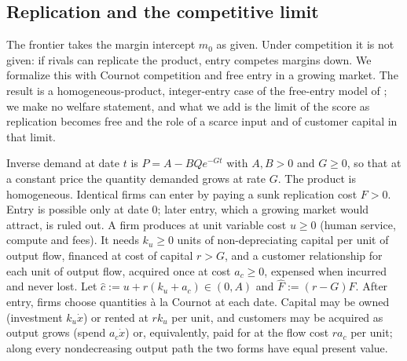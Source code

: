 \subsection{Replication and the competitive limit}\label{sec:model-entry}

The frontier takes the margin intercept $m_0$ as given. Under competition it is not given: if rivals can replicate the product, entry competes margins down. We formalize this with Cournot competition and free entry in a growing market. The result is a homogeneous-product, integer-entry case of the free-entry model of \citet{mankiw1986free}; we make no welfare statement, and what we add is the limit of the score as replication becomes free and the role of a scarce input and of customer capital in that limit.

\begin{assumption}\label{ass:entry}
Inverse demand at date $t$ is $P=A-BQe^{-Gt}$ with $A,B>0$ and $G\ge 0$, so that at a constant price the quantity demanded grows at rate $G$. The product is homogeneous. Identical firms can enter by paying a sunk replication cost $F>0$. Entry is possible only at date $0$; later entry, which a growing market would attract, is ruled out. A firm produces at unit variable cost $u\ge 0$ (human service, compute and fees). It needs $k_u\ge 0$ units of non-depreciating capital per unit of output flow, financed at cost of capital $r>G$, and a customer relationship for each unit of output flow, acquired once at cost $a_c\ge0$, expensed when incurred and never lost. Let $\hat c:=u+r(k_u+a_c)\in(0,A)$ and $\hat F:=(r-G)F$. After entry, firms choose quantities \`a la Cournot at each date. Capital may be owned (investment $k_u\dot x$) or rented at $rk_u$ per unit, and customers may be acquired as output grows (spend $a_c\dot x$) or, equivalently, paid for at the flow cost $ra_c$ per unit; along every nondecreasing output path the two forms have equal present value.
\end{assumption}

